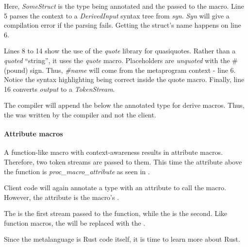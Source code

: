 
Here, \textit{SomeStruct} is the type being annotated and the  passed to the macro.
Line 5 parses the context to a \textit{DerivedInput} syntax tree from \textit{syn}.
\textit{Syn} will give a compilation error if the parsing fails.
Getting the struct's name happens on line 6.

Lines 8 to 14 show the use of the \textit{quote} library for quasiquotes.
Rather than a \textit{quoted} ``string'', it uses the \textit{quote} macro.
Placeholders are \textit{unquoted} with the \# (pound) sign.
Thus, \textit{\#name} will come from the metaprogram context - line 6.
Notice the syntax highlighting being correct inside the quote macro.
Finally, line 16 converts \textit{output} to a \textit{TokenStream}.

The compiler will append the  below the annotated type for derive macros.
Thus, the  was written by the compiler and not the client.

\paragraph{Attribute macros}
A function-like macro with context-awareness results in attribute macros.
Therefore, two token streams are passed to them.
This time the attribute above the function is \textit{proc\_macro\_attribute} as seen in .


Client code will again annotate a type with an attribute to call the macro.
However, the attribute is the macro's .


The  is the first stream passed to the function, while the  is the second.
Like function macros, the  will be replaced with the .

Since the metalanguage is Rust code itself, it is time to learn more about Rust.



